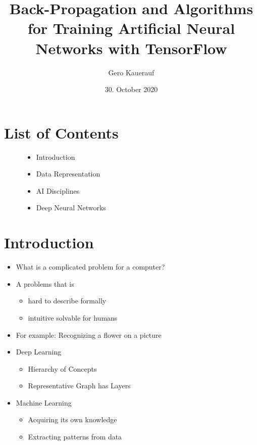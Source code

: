 \documentclass[t]{beamer}
\begin{document}

\title{Back-Propagation and Algorithms for Training Artificial Neural Networks with TensorFlow}
\date{30. October 2020}
\author{Gero Kauerauf}

\frame{\titlepage}

\section{List of Contents}
\begin{frame}
    \begin{figure}
        \centering
        \begin{itemize}
            \item Introduction
            \item Data Representation
            \item AI Disciplines
            \item Deep Neural Networks
        \end{itemize}
    \end{figure}
\end{frame}


\section{Introduction}
\begin{frame}
    \begin{itemize}
        \item What is a complicated problem for a computer?
        \item A problems that is
        \begin{itemize}
            \item hard to describe formally
            \item intuitive solvable for humans
        \end{itemize}
        \item For example: Recognizing a flower on a picture
        \item Deep Learning
        \begin{itemize}
            \item Hierarchy of Concepts
            \item Representative Graph has Layers
        \end{itemize}
        \item Machine Learning
        \begin{itemize}
            \item Acquiring its own knowledge
            \item Extracting patterns from data
        \end{itemize}
    \end{itemize}
\end{frame}
\end{document}
